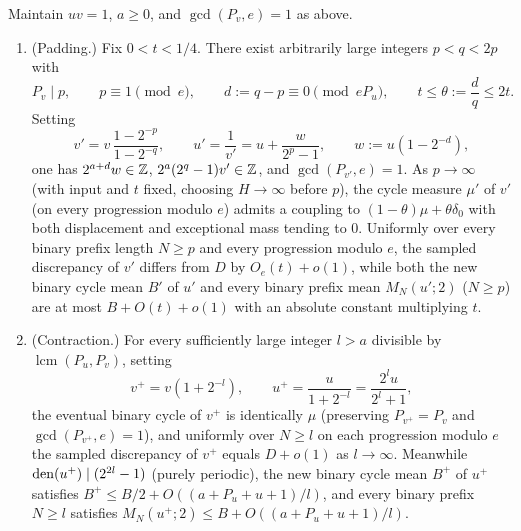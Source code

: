 \documentclass[11pt]{article}
\DeclareMathOperator{\lcm}{lcm}
\begin{document}
\begin{proposition}\label{prop:dyadic-ops}
Maintain $uv=1$, $a\ge0$, and $\gcd(P_v,e)=1$ as above.
\begin{enumerate}[label=\textup{(\alph*)},nosep]
\item \textup{(Padding.)} Fix $0<t<1/4$. There exist arbitrarily large integers $p<q<2p$ with
\[
P_v\mid p,\qquad p\equiv1\pmod e,\qquad d:=q-p\equiv0\pmod{eP_u},\qquad t\le\theta:=\frac dq\le 2t.
\]
Setting
\[
v'=v\,\frac{1-2^{-p}}{1-2^{-q}},\qquad u'=\frac1{v'}=u+\frac{w}{2^p-1},\qquad w:=u(1-2^{-d}),
\]
one has $2^{a+d}w\in\mathbb Z$, $2^a(2^q-1)v'\in\mathbb Z$, and $\gcd(P_{v'},e)=1$. As $p\to\infty$ (with input and $t$ fixed, choosing $H\to\infty$ before $p$), the cycle measure $\mu'$ of $v'$ (on every progression modulo $e$) admits a coupling to $(1-\theta)\mu+\theta\delta_0$ with both displacement and exceptional mass tending to $0$. Uniformly over every binary prefix length $N\ge p$ and every progression modulo $e$, the sampled discrepancy of $v'$ differs from $D$ by $O_e(t)+o(1)$, while both the new binary cycle mean $B'$ of $u'$ and every binary prefix mean $M_N(u';2)$ ($N\ge p$) are at most $B+O(t)+o(1)$ with an absolute constant multiplying $t$.
\item \textup{(Contraction.)} For every sufficiently large integer $l>a$ divisible by $\lcm(P_u,P_v)$, setting
\[
v^+=v(1+2^{-l}),\qquad u^+=\frac{u}{1+2^{-l}}=\frac{2^lu}{2^l+1},
\]
the eventual binary cycle of $v^+$ is identically $\mu$ (preserving $P_{v^+}=P_v$ and $\gcd(P_{v^+},e)=1$), and uniformly over $N\ge l$ on each progression modulo $e$ the sampled discrepancy of $v^+$ equals $D+o(1)$ as $l\to\infty$. Meanwhile $\operatorname{den}(u^+)\mid(2^{2l}-1)$ (purely periodic), the new binary cycle mean $B^+$ of $u^+$ satisfies $B^+\le B/2+O((a+P_u+u+1)/l)$, and every binary prefix $N\ge l$ satisfies $M_N(u^+;2)\le B+O((a+P_u+u+1)/l)$.
\end{enumerate}
\end{proposition}
\end{document}
